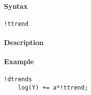


	\paragraph{Syntax}

\begin{verbatim}
!ttrend
\end{verbatim}

\paragraph{Description}

\paragraph{Example}

\begin{verbatim}
!dtrends
    log(Y) += a*!ttrend;
\end{verbatim}


